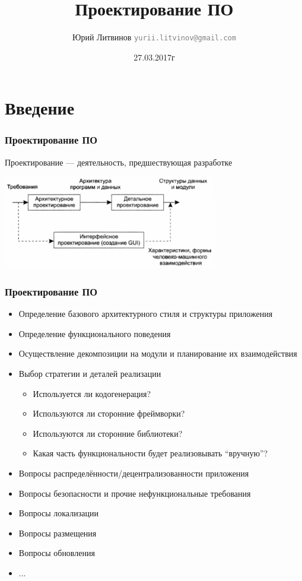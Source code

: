 \documentclass[xetex,mathserif,serif]{beamer}
\title{Проектирование ПО}
\author[Юрий Литвинов]{Юрий Литвинов \newline \textcolor{gray}{\small\texttt{yurii.litvinov@gmail.com}}}
\date{27.03.2017г}
\begin{document}
	
	\frame{\titlepage}
	
	\section{Введение}

	\begin{frame}
		\frametitle{Проектирование ПО}
		Проектирование --- деятельность, предшествующая разработке
		\vskip 1.5cm
		\begin{center}
			\includegraphics[width=0.7\textwidth]{softwareDesign.png}
		\end{center}
	\end{frame}

	\begin{frame}
		\frametitle{Проектирование ПО}
		\begin{itemize}
			\item Определение базового архитектурного стиля и структуры приложения
			\item Определение функционального поведения
			\item Осуществление декомпозиции на модули и планирование их взаимодействия
			\item Выбор стратегии и деталей реализации
			\begin{itemize}
				\item Используется ли кодогенерация?
				\item Используются ли сторонние фреймворки?
				\item Используются ли сторонние библиотеки?
				\item Какая часть функциональности будет реализовывать ``вручную''?
			\end{itemize}
			\item Вопросы распределённости/децентрализованности приложения
			\item Вопросы безопасности и прочие нефункциональные требования
			\item Вопросы локализации
			\item Вопросы размещения
			\item Вопросы обновления
			\item ...
		\end{itemize}
	\end{frame}
\end{document}
